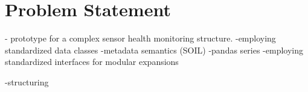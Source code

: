 \chapter{Problem Statement}


- prototype for a complex sensor health monitoring structure.
    -employing standardized data classes
        -metadata semantics (SOIL)
        -pandas series
    -employing standardized interfaces for modular expansions



-structuring